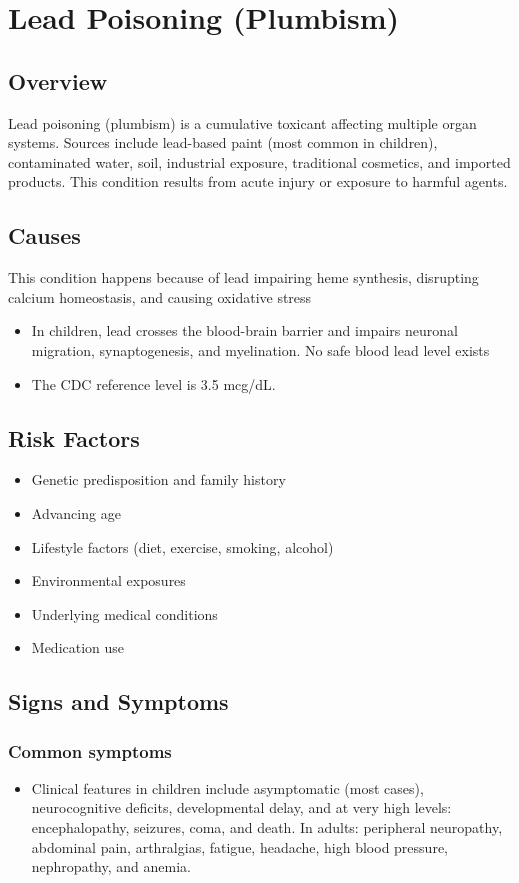 \chapter{Lead Poisoning (Plumbism)}
\label{sec:Lead Poisoning}

\section{Overview}
Lead poisoning (plumbism) is a cumulative toxicant affecting multiple organ systems. Sources include lead-based paint (most common in children), contaminated water, soil, industrial exposure, traditional cosmetics, and imported products. This condition results from acute injury or exposure to harmful agents.
\section{Causes}
This condition happens because of lead impairing heme synthesis, disrupting calcium homeostasis, and causing oxidative stress

\begin{itemize}[noitemsep]
  \item In children, lead crosses the blood-brain barrier and impairs neuronal migration, synaptogenesis, and myelination. No safe blood lead level exists
  \item The CDC reference level is 3.5 mcg/dL.
\end{itemize}
\section{Risk Factors}


\begin{itemize}[noitemsep]
  \item Genetic predisposition and family history
  \item Advancing age
  \item Lifestyle factors (diet, exercise, smoking, alcohol)
  \item Environmental exposures
  \item Underlying medical conditions
  \item Medication use
\end{itemize}
\section{Signs and Symptoms}

\subsection{Common symptoms}
\begin{itemize}[noitemsep]
  \item Clinical features in children include asymptomatic (most cases), neurocognitive deficits, developmental delay, and at very high levels: encephalopathy, seizures, coma, and death. In adults: peripheral neuropathy, abdominal pain, arthralgias, fatigue, headache, high blood pressure, nephropathy, and anemia. 
  \end{itemize}

